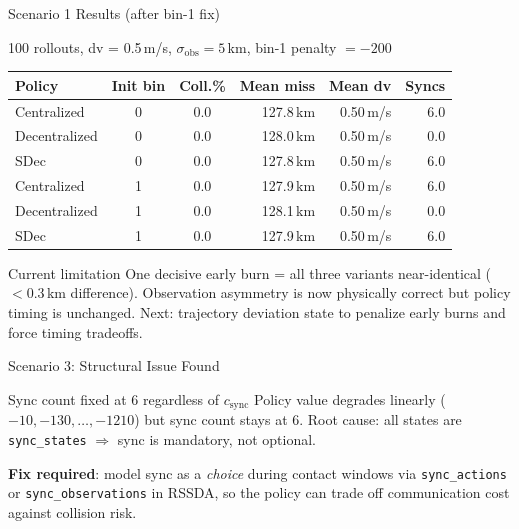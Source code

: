\documentclass[aspectratio=169]{beamer}
\newcommand{\good}[1]{\textcolor{green!60!black}{#1}}
\begin{document}
\begin{frame}{Scenario 1 Results (after bin-1 fix)}
  \begin{block}{100 rollouts, dv = 0.5\,m/s, $\sigma_\text{obs}=5$\,km, bin-1 penalty $=-200$}
  \end{block}
  \vspace{0.4em}
  \begin{center}
  \begin{tabular}{lccrrr}
    \toprule
    Policy & Init bin & Coll.\% & Mean miss & Mean dv & Syncs \\
    \midrule
    Centralized   & 0 & \good{0.0} & 127.8\,km & 0.50\,m/s & 6.0 \\
    Decentralized & 0 & \good{0.0} & 128.0\,km & 0.50\,m/s & 0.0 \\
    SDec          & 0 & \good{0.0} & 127.8\,km & 0.50\,m/s & 6.0 \\
    \midrule
    Centralized   & 1 & \good{0.0} & 127.9\,km & 0.50\,m/s & 6.0 \\
    Decentralized & 1 & \good{0.0} & 128.1\,km & 0.50\,m/s & 0.0 \\
    SDec          & 1 & \good{0.0} & 127.9\,km & 0.50\,m/s & 6.0 \\
    \bottomrule
  \end{tabular}
  \end{center}
  \vspace{0.4em}
  \begin{alertblock}{Current limitation}
    One decisive early burn = all three variants near-identical ($<0.3$\,km difference).
    Observation asymmetry is now physically correct but policy timing is unchanged.
    Next: trajectory deviation state to penalize early burns and force timing tradeoffs.
  \end{alertblock}
\end{frame}

\begin{frame}{Scenario 3: Structural Issue Found}
  \begin{alertblock}{Sync count fixed at 6 regardless of $c_\text{sync}$}
    Policy value degrades linearly ($-10, -130, \ldots, -1210$) but sync count stays at 6.
    Root cause: all states are \texttt{sync\_states} $\Rightarrow$ sync is mandatory, not optional.
  \end{alertblock}
  \vspace{0.5em}
  \textbf{Fix required}: model sync as a \emph{choice} during contact windows via
  \texttt{sync\_actions} or \texttt{sync\_observations} in RSSDA, so the policy can
  trade off communication cost against collision risk.

\end{frame}
\end{document}
